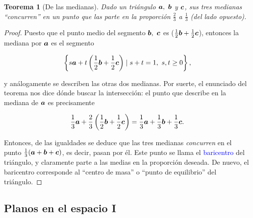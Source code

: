 \documentclass{article}
\theoremstyle{definicion}
\theoremstyle{definition}             %
\theoremstyle{definition}             %
\theoremstyle{definition}
\theoremstyle{definition}
\theoremstyle{observacion}
\theoremstyle{definition}
\theoremstyle{plain}
\newtheorem{theorem}{Teorema}
\theoremstyle{definition}
\theoremstyle{afirmacion}
\theoremstyle{notation}
\theoremstyle{definition}
\begin{document}
    \begin{theorem}[De las medianas]
        Dado un triángulo \(\vb*{a},\ \vb*{b}\) y \(\vb*{c}\), sus tres medianas ``concurren'' en un punto que las parte en la proporción \(\frac{2}{3}\) a \(\frac{1}{3}\) (del lado opuesto).

    \end{theorem}

    \begin{proof}
        Puesto que el punto medio del segmento \(\vb*{b},\ \vb*{c}\) es (\(\frac{1}{2}\vb*{b} + \frac{1}{2}\vb*{c}\)), entonces la mediana por \(\vb*{a}\) es el segmento

        \begin{equation*}
            \left\lbrace s\vb*{a} + t \left(\dfrac{1}{2}\vb*{b} + \dfrac{1}{2}\vb*{c}\right) \mid s + t = 1,\ s, t \geq 0\right\rbrace,
        \end{equation*}

        y análogamente se describen las otras dos medianas. Por suerte, el enunciado del teorema nos dice dónde buscar la intersección: el punto que describe en la mediana de \(\vb*{a}\) es precisamente

        \begin{equation*}
            \dfrac{1}{3}\vb*{a} + \dfrac{2}{3}\left(\dfrac{1}{2}\vb*{b} + \dfrac{1}{2}\vb*{c}\right) = \dfrac{1}{3}\vb*{a} + \dfrac{1}{3}\vb*{b} + \dfrac{1}{3}\vb*{c}.
        \end{equation*}

        Entonces, de las igualdades se deduce que las tres medianas \emph{concurren} en el punto \(\frac{1}{3}(\vb*{a} + \vb*{b} + \vb*{c})\), es decir, pasan por él. Este punto se llama el \textcolor{blue}{baricentro} del triángulo, y claramente parte a las medias en la proporción deseada. De nuevo, el baricentro corresponde al ``centro de masa'' o ``punto de equilibrio'' del triángulo.
    \end{proof}

    \subsection{Planos en el espacio I}

\end{document}

